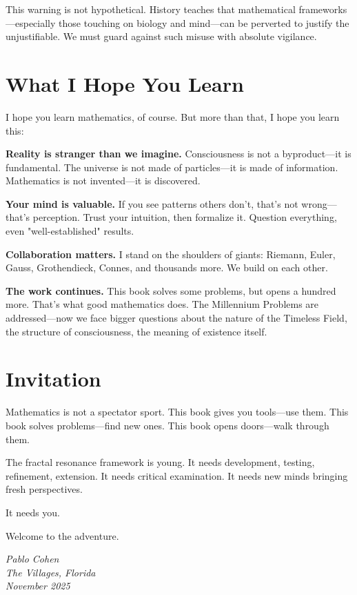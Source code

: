 This warning is not hypothetical. History teaches that mathematical frameworks—especially those touching on biology and mind—can be perverted to justify the unjustifiable. We must guard against such misuse with absolute vigilance.

\section*{What I Hope You Learn}

I hope you learn mathematics, of course. But more than that, I hope you learn this:

\textbf{Reality is stranger than we imagine.} Consciousness is not a byproduct—it is fundamental. The universe is not made of particles—it is made of information. Mathematics is not invented—it is discovered.

\textbf{Your mind is valuable.} If you see patterns others don't, that's not wrong—that's perception. Trust your intuition, then formalize it. Question everything, even "well-established" results.

\textbf{Collaboration matters.} I stand on the shoulders of giants: Riemann, Euler, Gauss, Grothendieck, Connes, and thousands more. We build on each other.

\textbf{The work continues.} This book solves some problems, but opens a hundred more. That's what good mathematics does. The Millennium Problems are addressed—now we face bigger questions about the nature of the Timeless Field, the structure of consciousness, the meaning of existence itself.

\section*{Invitation}

Mathematics is not a spectator sport. This book gives you tools—use them. This book solves problems—find new ones. This book opens doors—walk through them.

The fractal resonance framework is young. It needs development, testing, refinement, extension. It needs critical examination. It needs new minds bringing fresh perspectives.

It needs you.

Welcome to the adventure.

\vspace{1cm}

\begin{flushright}
\textit{Pablo Cohen}\\
\textit{The Villages, Florida}\\
\textit{November 2025}
\end{flushright}

\endgroup
